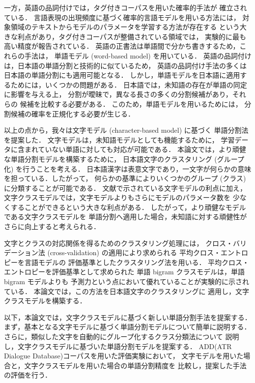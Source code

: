 一方，英語の品詞付けでは，タグ付きコーパスを用いた確率的手法が
確立されている\cite{Church88,Cutting92,Charniak93}．
言語表現の出現頻度に基づく確率的言語モデルを用いる方法には，
対象領域のテキストからモデルのパラメータを学習する方法が存在する
という大きな利点があり，タグ付きコーパスが整備されている領域では，
実験的に最も高い精度が報告されている．
英語の正書法は単語間で分かち書きするため，これらの手法は，
単語モデル (word-based model) を用いている．
英語の品詞付けは，日本語の単語分割と技術的に似ているため，
英語の品詞付け手法の多くは日本語の単語分割にも適用可能となる．
しかし，単語モデルを日本語に適用するためには，いくつかの問題がある．
日本語では，未知語の存在が単語の同定に影響を与える上，
分割が曖昧で，異なる長さの多くの分割候補があり，それらの
候補を比較する必要がある\cite{Yamamoto97}．
このため，単語モデルを用いるためには，
分割候補の確率を正規化する必要が生じる．

以上の点から，我々は文字モデル (character-based model) に基づく
単語分割法を提案した\cite{Oda99a,Oda99b}．
文字モデルは，未知語モデルとしても機能するために，
学習データに含まれていない単語に対しても対応が可能である．
本論文では，より頑健な単語分割モデルを構築するために，
日本語文字のクラスタリング (グループ化) を行うことを考える．
日本語漢字は表意文字であり，一文字が何らかの意味を担っている．したがって，
何らかの基準によりいくつかのグループ (クラス) に分類することが可能である．
文献\cite{Yamamoto97}で示されている文字モデルの利点に加え，
文字クラスモデルでは，文字モデルよりもさらにモデルのパラメータ数を
少なくすることができるという大きな利点がある．
したがって，より頑健なモデルである文字クラスモデルを
単語分割へ適用した場合，未知語に対する頑健性がさらに向上すると考えられる．

文字とクラスの対応関係を得るためのクラスタリング処理には，
クロス・バリデーション法 (cross-validation) の適用により求められる
平均クロス・エントロピーを言語モデルの
評価基準としたクラスタリング法\cite{Mori97}を用いる．
平均クロス・エントロピーを評価基準として求められた
単語 bigram クラスモデルは，単語 bigram モデルよりも
予測力という点において優れていることが実験的に示されている\cite{Mori97,Mori98}．
本論文では，この方法を日本語文字のクラスタリングに
適用し，文字クラスモデルを構築する．

以下，本論文では，文字クラスモデルに基づく新しい単語分割手法を提案する．
まず，基本となる文字モデルに基づく単語分割モデルについて簡単に説明する．
さらに，類似した文字を自動的にグループ化するクラス分類法について
説明し，文字クラスモデルに基づいた単語分割モデルを提案する．
ADD(ATR Dialogue Database)コーパスを用いた評価実験において，
文字モデルを用いた場合と，文字クラスモデルを用いた場合の単語分割精度を
比較し，提案した手法の評価を行う．

